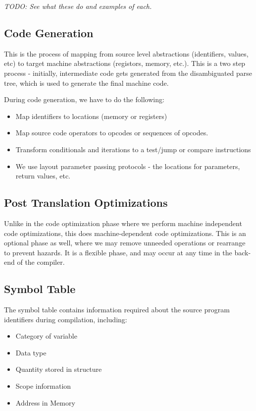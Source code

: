 \documentclass[12pt,letterpaper]{article}
\begin{document}
\textit{TODO: See what these do and examples of each.}

\subsection{Code Generation}

This is the process of mapping from source level abstractions (identifiers, values, etc) to target machine abstractions (registors, memory, etc.). This is a two step process - initially, intermediate code gets generated from the disambiguated parse tree, which is used to generate the final machine code.

During code generation, we have to do the following:

\begin{itemize}
  \item Map identifiers to locations (memory or registers)
  \item Map source code operators to opcodes or sequences of opcodes.
  \item Transform conditionals and iterations to a test/jump or compare instructions
  \item We use layout parameter passing protocols - the locations for parameters, return values, etc.
\end{itemize}

\subsection{Post Translation Optimizations}

Unlike in the code optimization phase where we perform machine independent code optimizations, this does machine-dependent code optimizations. This is an optional phase as well, where we may remove unneeded operations or rearrange to prevent hazards. It is a flexible phase, and may occur at any time in the back-end of the compiler.

\subsection{Symbol Table}

The symbol table contains information required about the source program identifiers during compilation, including:

\begin{itemize}
  \item Category of variable
  \item Data type
  \item Quantity stored in structure
  \item Scope information
  \item Address in Memory
\end{itemize}
\end{document}
